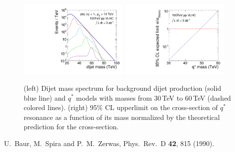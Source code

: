 \begin{figure}
\begin{center}
\includegraphics[width=0.475\textwidth]{QstarVLHC/plots/qstar_100TeV}
\includegraphics[width=0.475\textwidth]{QstarVLHC/plots/qstar_limits}
\end{center}
\caption{\label{fig:qstar_vlhc}(left) Dijet mass spectrum for
  background dijet production (solid blue line) and $q^*$ models with
  masses from 30\,TeV to 60\,TeV (dashed colored lines). (right) 95\%
  CL upperlimit on the cross-section of $q^*$ resonance as a function
  of its mass normalized by the theoretical prediction for the
  cross-section.}
\end{figure}

\begin{thebibliography}{99}

  U.~Baur, M.~Spira and P.~M.~Zerwas,
  Phys.\ Rev.\ D {\bf 42}, 815 (1990).

\end{thebibliography}


